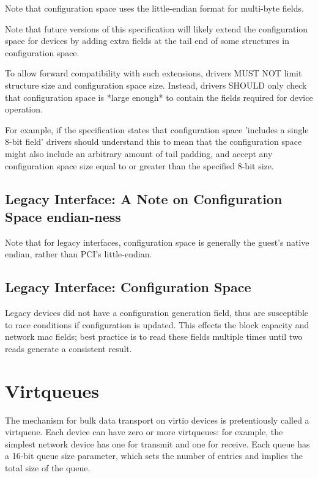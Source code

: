 Note that configuration space uses the little-endian format
for multi-byte fields.

Note that future versions of this specification will likely
extend the configuration space for devices by adding extra fields
at the tail end of some structures in configuration space.

To allow forward compatibility with such extensions, drivers MUST
NOT limit structure size and configuration space size.  Instead,
drivers SHOULD only check that configuration space is *large enough* to
contain the fields required for device operation.

For example, if the specification states that configuration
space 'includes a single 8-bit field' drivers should understand this to mean that
the configuration space might also include an arbitrary amount of
tail padding, and accept any configuration space size equal to or
greater than the specified 8-bit size.

\subsection{Legacy Interface: A Note on Configuration Space endian-ness}\label{sec:Basic Facilities of a Virtio Device / Configuration Space / Legacy Interface: A Note on Configuration Space endian-ness}

Note that for legacy interfaces, configuration space is generally the
guest's native endian, rather than PCI's little-endian.

\subsection{Legacy Interface: Configuration Space}\label{sec:Basic Facilities of a Virtio Device / Configuration Space / Legacy Interface: Configuration Space}

Legacy devices did not have a configuration generation field, thus are
susceptible to race conditions if configuration is updated.  This
effects the block capacity and network mac fields; best practice is to
read these fields multiple times until two reads generate a consistent
result.

\section{Virtqueues}\label{sec:Basic Facilities of a Virtio Device / Virtqueues}

The mechanism for bulk data transport on virtio devices is
pretentiously called a virtqueue. Each device can have zero or more
virtqueues: for example, the simplest network device has one for
transmit and one for receive.  Each queue has a 16-bit queue size
parameter, which sets the number of entries and implies the total size
of the queue.

